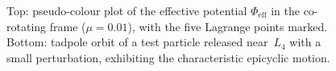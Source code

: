 \begin{figure}[htbp]
  \centering
  
  \caption{Top: pseudo-colour plot of the effective potential
    $\Phi_{\mathrm{eff}}$ in the co-rotating frame ($\mu = 0.01$),
    with the five Lagrange points marked.
    Bottom: tadpole orbit of a test particle released near~$L_4$
    with a small perturbation, exhibiting the characteristic
    epicyclic motion.}\label{fig:lagrange-points}
\end{figure}

